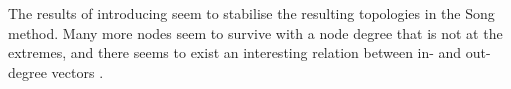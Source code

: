 The results of introducing \IP seem to stabilise the resulting topologies in the Song method. Many more nodes seem to survive with a node degree that is not at the extremes, and there seems to exist an interesting relation between in- and out-degree vectors \cite{Song2017}.




